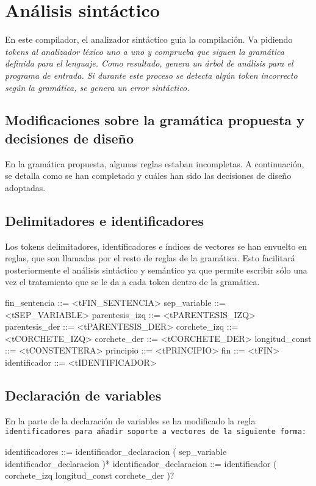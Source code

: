 \section{Análisis sintáctico}
En este compilador, el analizador sintáctico guia la compilación. Va pidiendo \it{tokens} al analizador léxico uno a uno y comprueba que siguen la gramática definida para el lenguaje. Como resultado, genera un árbol de análisis para el programa de entrada. Si durante este proceso se detecta algún token incorrecto según la gramática, se genera un error sintáctico.

\subsection{Modificaciones sobre la gramática propuesta y decisiones de diseño}
En la gramática propuesta, algunas reglas estaban incompletas.
A continuación, se detalla como se han completado y cuáles han sido las decisiones de diseño adoptadas.

\subsection{Delimitadores e identificadores}
Los tokens delimitadores, identificadores e índices de vectores se han envuelto en reglas, que son llamadas por el resto de reglas de la gramática. Esto facilitará posteriormente el análisis sintáctico y semántico ya que permite escribir sólo una vez el tratamiento que se le da a cada token dentro de la gramática.

\begin{codigo}
fin_sentencia ::= <tFIN_SENTENCIA>
sep_variable ::= <tSEP_VARIABLE>
parentesis_izq ::= <tPARENTESIS_IZQ>
parentesis_der ::= <tPARENTESIS_DER>
corchete_izq ::= <tCORCHETE_IZQ>
corchete_der ::= <tCORCHETE_DER>
longitud_const ::= <tCONSTENTERA>
principio ::= <tPRINCIPIO>
fin ::= <tFIN>
identificador ::= <tIDENTIFICADOR>
\end{codigo}

\subsection{Declaración de variables}
En la parte de la declaración de variables se ha modificado la regla \tt{identificadores} para añadir soporte a vectores de la siguiente forma:

\begin{codigo}
identificadores ::= identificador_declaracion ( sep_variable identificador_declaracion )*
identificador_declaracion ::= identificador ( corchete_izq longitud_const corchete_der )?
\end{codigo}


